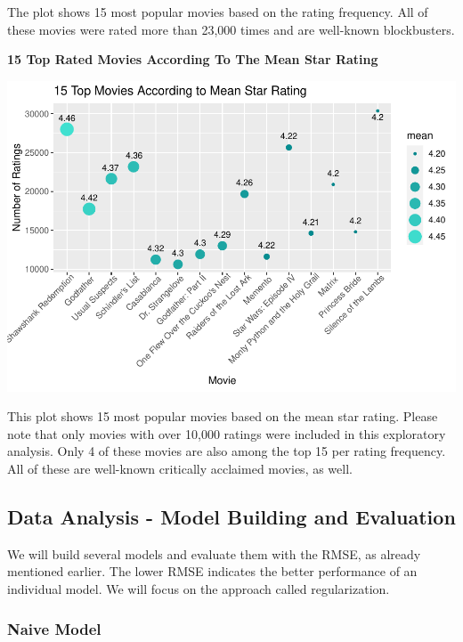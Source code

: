 \documentclass[
]{article}
\begin{document}
The plot shows 15 most popular movies based on the rating frequency. All
of these movies were rated more than 23,000 times and are well-known
blockbusters.

\newpage

\textbf{15 Top Rated Movies According To The Mean Star Rating}

\begin{center}\includegraphics{MovieLens-Report_MitjaPrah_files/figure-latex/unnamed-chunk-32-1} \end{center}

This plot shows 15 most popular movies based on the mean star rating.
Please note that only movies with over 10,000 ratings were included in
this exploratory analysis. Only 4 of these movies are also among the top
15 per rating frequency. All of these are well-known critically
acclaimed movies, as well.

\hypertarget{data-analysis---model-building-and-evaluation}{%
\subsection{Data Analysis - Model Building and
Evaluation}\label{data-analysis---model-building-and-evaluation}}

We will build several models and evaluate them with the RMSE, as already
mentioned earlier. The lower RMSE indicates the better performance of an
individual model. We will focus on the approach called regularization.

\hypertarget{naive-model}{%
\subsubsection{Naive Model}\label{naive-model}}
\end{document}
